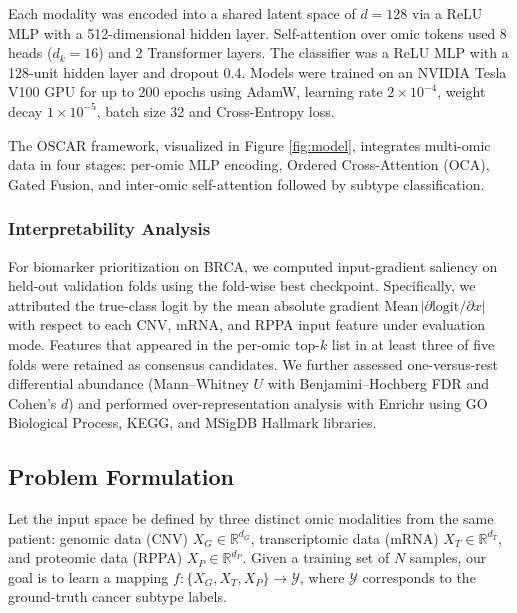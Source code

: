 \documentclass[lettersize,journal]{IEEEtran}
\begin{document}
Each modality was encoded into a shared latent space of $d=128$ via a ReLU MLP with a 512-dimensional hidden layer. Self-attention over omic tokens used 8 heads ($d_k=16$) and 2 Transformer layers. The classifier was a ReLU MLP with a 128-unit hidden layer and dropout 0.4. Models were trained on an NVIDIA Tesla V100 GPU for up to 200 epochs using AdamW, learning rate $2 \times 10^{-4}$, weight decay $1 \times 10^{-5}$, batch size 32 and Cross-Entropy loss.

The OSCAR framework, visualized in Figure \ref{fig:model}, integrates multi-omic data in four stages: per-omic MLP encoding, Ordered Cross-Attention (OCA), Gated Fusion, and inter-omic self-attention followed by subtype classification.

\subsubsection{Interpretability Analysis}
For biomarker prioritization on BRCA, we computed input-gradient saliency on held-out validation folds using the fold-wise best checkpoint.
Specifically, we attributed the true-class logit by the mean absolute gradient $\mathrm{Mean}\,|\partial\mathrm{logit}/\partial x|$ with respect to each CNV, mRNA, and RPPA input feature under evaluation mode.
Features that appeared in the per-omic top-$k$ list in at least three of five folds were retained as consensus candidates.
We further assessed one-versus-rest differential abundance (Mann--Whitney $U$ with Benjamini--Hochberg FDR and Cohen's $d$) and performed over-representation analysis with Enrichr using GO Biological Process, KEGG, and MSigDB Hallmark libraries.

\subsection{Problem Formulation}
Let the input space be defined by three distinct omic modalities from the same patient: genomic data (CNV) $X_{G} \in \mathbb{R}^{d_G}$, transcriptomic data (mRNA) $X_{T} \in \mathbb{R}^{d_T}$, and proteomic data (RPPA) $X_{P} \in \mathbb{R}^{d_P}$. Given a training set of $N$ samples, our goal is to learn a mapping $f: \{X_G, X_T, X_P\} \rightarrow \mathcal{Y}$, where $\mathcal{Y}$ corresponds to the ground-truth cancer subtype labels.
\end{document}
